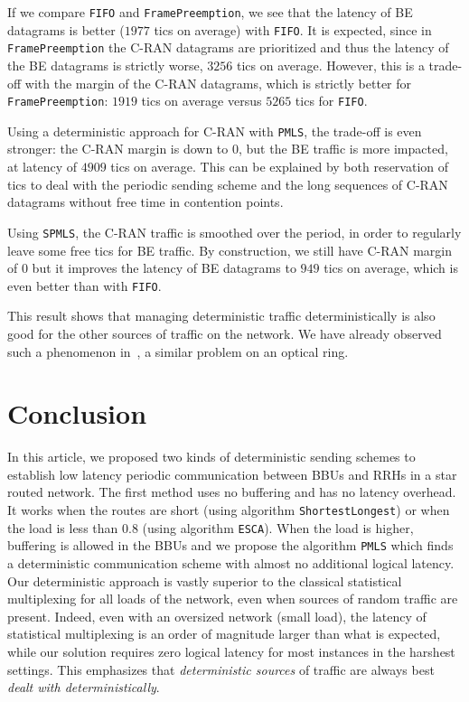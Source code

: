 \documentclass[a4paper,10pt]{journal}
\newcommand\shortestlongest{\texttt{ShortestLongest}\xspace}
\newcommand\ESCA{\texttt{ESCA}\xspace}
\newcommand\PMLS{\texttt{PMLS}\xspace}
\newcommand\SPMLS{\texttt{SPMLS}\xspace}
\newcommand\FIFO{\texttt{FIFO}\xspace}
\newcommand\framepre{\texttt{FramePreemption}\xspace}
\begin{document}
     If we compare \FIFO and \framepre, we see that the latency of BE datagrams is better ($1977$ tics on average) with \FIFO. It is expected, since in \framepre the C-RAN datagrams are prioritized and thus 
     the latency of the BE datagrams is strictly worse, $3256$ tics on average. However, this is a trade-off with the margin of the C-RAN datagrams, which is strictly better for \framepre: $1919$ tics on average versus $5265$ tics for \FIFO. 

     Using a deterministic approach for C-RAN with \PMLS, the trade-off is even stronger:
      the C-RAN margin is down to $0$, but the BE traffic is more impacted, at latency of $4909$ tics on average. This can be explained by both reservation of tics to deal with the periodic sending scheme and the long sequences of C-RAN datagrams without free time in contention points.
     
     Using \SPMLS, the C-RAN traffic is smoothed over the period, in order to regularly leave some free tics for BE traffic. By construction, we still have C-RAN margin of $0$ but it improves the latency of 
     BE datagrams to $949$ tics on average, which is even better than with \FIFO. 
     
      This result shows that managing deterministic traffic deterministically is also good for the other sources of traffic on the network. We have already observed such a phenomenon in~\cite{DBLP:conf/ondm/BarthGS19}, a similar 
     problem on an optical ring.
     


 \section{Conclusion}
 
	In this article, we proposed two kinds of deterministic sending schemes to establish low latency periodic communication between BBUs and RRHs in a star routed network. The first method uses no buffering and has no latency overhead. It works when the routes are short (using algorithm \shortestlongest) or when the load is less than $0.8$ (using algorithm \ESCA).  
	When the load is higher, buffering is allowed in the BBUs and we propose the algorithm \PMLS which finds a deterministic communication scheme with almost no additional logical latency.
 	Our deterministic approach is vastly superior to the classical statistical multiplexing for all loads of the network, even when sources of random traffic are present. Indeed, even with an oversized network (small load), the latency of statistical multiplexing is an order of magnitude larger than what is expected, while our solution requires zero logical latency for most instances in the harshest settings. This emphasizes that \emph{deterministic sources} of traffic are always best \emph{dealt with deterministically}.  
    
\end{document}
